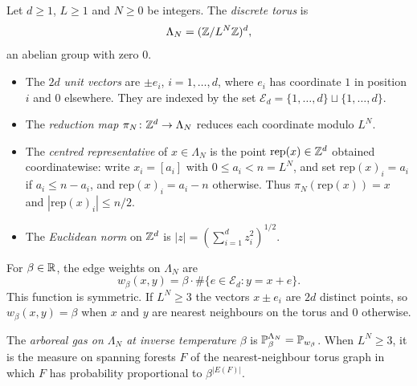 \documentclass[11pt]{amsart}
\numberwithin{equation}{section}
\numberwithin{theorem}{section}
\begin{document}
\begin{definition}[Torus]\label{def:torus}
Let $d\ge 1$, $L\ge 1$ and $N\ge 0$ be integers. The \emph{discrete torus} is
\[
  \Lambda_N=(\Z/L^N\Z)^d,
\]
an abelian group with zero $0$.
\begin{itemize}
\item The $2d$ \emph{unit vectors} are $\pm e_i$, $i=1,\dots,d$, where $e_i$ has coordinate $1$
  in position $i$ and $0$ elsewhere. They are indexed by the set
  $\mathcal E_d=\{1,\dots,d\}\sqcup\{1,\dots,d\}$.
\item The \emph{reduction map} $\pi_N\colon\Z^d\to\Lambda_N$ reduces each coordinate modulo
  $L^N$.
\item The \emph{centred representative} of $x\in\Lambda_N$ is the point
  $\mathrm{rep}(x)\in\Z^d$ obtained coordinatewise: write $x_i=[a_i]$ with $0\le a_i<n=L^N$,
  and set $\mathrm{rep}(x)_i=a_i$ if $a_i\le n-a_i$, and $\mathrm{rep}(x)_i=a_i-n$ otherwise.
  Thus $\pi_N(\mathrm{rep}(x))=x$ and $|\mathrm{rep}(x)_i|\le n/2$.
\item The \emph{Euclidean norm} on $\Z^d$ is $|z|=(\sum_{i=1}^d z_i^2)^{1/2}$.
\end{itemize}
\end{definition}

\begin{definition}\label{def:nnW}
For $\beta\in\R$, the edge weights on $\Lambda_N$ are
\begin{equation}\label{e:nnW}
  w_\beta(x,y)=\beta\cdot\#\{e\in\mathcal E_d : y=x+e\}.
\end{equation}
This function is symmetric. If $L^N\ge 3$ the vectors
$x\pm e_i$ are $2d$ distinct points, so $w_\beta(x,y)=\beta$ when $x$ and $y$ are nearest
neighbours on the torus and $0$ otherwise.

The \emph{arboreal gas on $\Lambda_N$ at inverse temperature $\beta$} is
$\P_{\beta}^{\Lambda_N}=\P_{w_\beta}$. When $L^N\ge3$, it is the measure on spanning
forests $F$ of the nearest-neighbour torus graph in which $F$ has probability proportional to
$\beta^{|E(F)|}$.
\end{definition}
\end{document}
